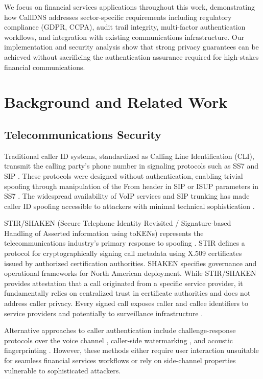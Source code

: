 \documentclass[11pt,twocolumn]{article}
\begin{document}
We focus on financial services applications throughout this work, demonstrating how CallDNS addresses sector-specific requirements including regulatory compliance (GDPR, CCPA), audit trail integrity, multi-factor authentication workflows, and integration with existing communications infrastructure. Our implementation and security analysis show that strong privacy guarantees can be achieved without sacrificing the authentication assurance required for high-stakes financial communications.

\section{Background and Related Work}

\subsection{Telecommunications Security}

Traditional caller ID systems, standardized as Calling Line Identification (CLI), transmit the calling party's phone number in signaling protocols such as SS7 and SIP \cite{rosenberg2002}. These protocols were designed without authentication, enabling trivial spoofing through manipulation of the From header in SIP or ISUP parameters in SS7 \cite{tu2018}. The widespread availability of VoIP services and SIP trunking has made caller ID spoofing accessible to attackers with minimal technical sophistication \cite{reaves2017}.

STIR/SHAKEN (Secure Telephone Identity Revisited / Signature-based Handling of Asserted information using toKENs) represents the telecommunications industry's primary response to spoofing \cite{stirshaken2020}. STIR defines a protocol for cryptographically signing call metadata using X.509 certificates issued by authorized certification authorities. SHAKEN specifies governance and operational frameworks for North American deployment. While STIR/SHAKEN provides attestation that a call originated from a specific service provider, it fundamentally relies on centralized trust in certificate authorities and does not address caller privacy. Every signed call exposes caller and callee identifiers to service providers and potentially to surveillance infrastructure \cite{wang2020}.

Alternative approaches to caller authentication include challenge-response protocols over the voice channel \cite{bellovin1993}, caller-side watermarking \cite{wu2006}, and acoustic fingerprinting \cite{reaves2016}. However, these methods either require user interaction unsuitable for seamless financial services workflows or rely on side-channel properties vulnerable to sophisticated attackers.
\end{document}
